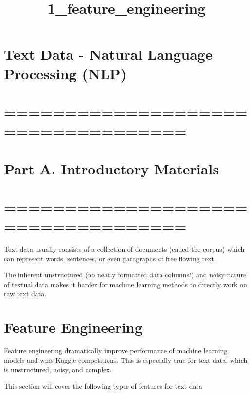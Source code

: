 \documentclass[11pt]{article}
\title{1\_feature\_engineering}
\begin{document}
    
    
    \maketitle
    
    

    
    \hypertarget{text-data---natural-language-processing-nlp}{%
\section{Text Data - Natural Language Processing
(NLP)}\label{text-data---natural-language-processing-nlp}}

    \hypertarget{section}{%
\section{===================================}\label{section}}

\hypertarget{part-a.-introductory-materials}{%
\section{Part A. Introductory
Materials}\label{part-a.-introductory-materials}}

\hypertarget{section-1}{%
\section{===================================}\label{section-1}}

    Text data usually consists of a collection of documents (called the
corpus) which can represent words, sentences, or even paragraphs of free
flowing text.

The inherent unstructured (no neatly formatted data columns!) and noisy
nature of textual data makes it harder for machine learning methods to
directly work on raw text data.

    \hypertarget{feature-engineering}{%
\section{Feature Engineering}\label{feature-engineering}}

    Feature engineering dramatically improve performance of machine learning
models and wins Kaggle competitions. This is especially true for text
data, which is unstructured, noisy, and complex.

This section will cover the following types of features for text data
\end{document}
